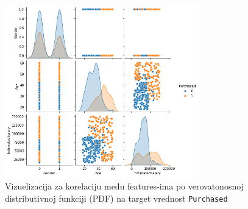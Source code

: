 \documentclass[fontsize=12bp, paper=a4]{scrarticle}
\begin{document}
\begin{figure}[h!]
    \centering
    \includegraphics[width=0.75\textwidth]{32.png}
    \caption{\centering Vizuelizacija za korelaciju među features-ima po verovatonosnoj distributivnoj funkciji (PDF) na target vrednost \texttt{Purchased}}
\end{figure}      
\end{document}
